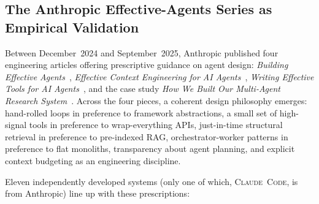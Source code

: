 \documentclass[11pt,a4paper]{article}
\newcommand{\clcode}{\textsc{Claude~Code}\xspace}
\begin{document}
\subsection{The Anthropic Effective-Agents Series as Empirical Validation}
\label{sec:anthropic_validation}

Between December~2024 and September~2025, Anthropic published four engineering articles offering prescriptive guidance on agent design: \emph{Building Effective Agents}~\cite{schluntz2024agents}, \emph{Effective Context Engineering for AI Agents}~\cite{rajasekaran2025context}, \emph{Writing Effective Tools for AI Agents}~\cite{aizawa2025tools}, and the case study \emph{How We Built Our Multi-Agent Research System}~\cite{hadfield2025multiagent}.
Across the four pieces, a coherent design philosophy emerges: hand-rolled loops in preference to framework abstractions, a small set of high-signal tools in preference to wrap-everything APIs, just-in-time structural retrieval in preference to pre-indexed RAG, orchestrator-worker patterns in preference to flat monoliths, transparency about agent planning, and explicit context budgeting as an engineering discipline.

Eleven independently developed systems (only one of which, \clcode{}, is from Anthropic) line up with these prescriptions:
\end{document}

